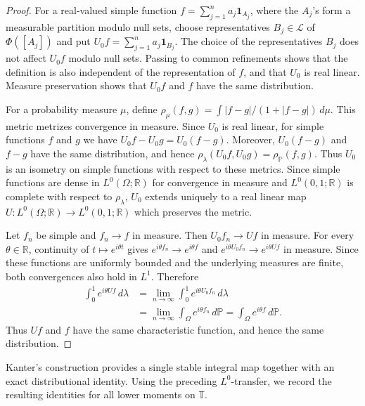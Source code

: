 \documentclass[10pt,a4paper]{amsart}
\newcommand{\T}{\mathbb{T}}
\newcommand{\R}{\mathbb{R}}
\begin{document}
\begin{proof}

For a real-valued simple function
\(f=\sum_{j=1}^n a_j\mathbf1_{A_j}\), where the \(A_j\)'s form a
measurable partition modulo null sets, choose representatives
\(B_j\in\mathcal L\) of \(\Phi([A_j])\) and put
\(U_0f=\sum_{j=1}^n a_j\mathbf1_{B_j}\).
The choice of the representatives \(B_j\) does not affect \(U_0f\)
modulo null sets. Passing to common refinements shows that the
definition is also independent of the representation of \(f\), and
that \(U_0\) is real linear. Measure preservation shows that \(U_0f\)
and \(f\) have the same distribution.

For a probability measure \(\mu\), define
\(\rho_\mu(f,g)=\int |f-g|/(1+|f-g|)\,d\mu\).
This metric metrizes convergence in measure. Since \(U_0\) is real
linear, for simple functions \(f\) and \(g\) we have
\(U_0f-U_0g=U_0(f-g)\). Moreover, \(U_0(f-g)\) and \(f-g\) have the
same distribution, and hence
\(\rho_\lambda(U_0f,U_0g)=\rho_{\mathbb P}(f,g)\).
Thus \(U_0\) is an isometry on simple functions with respect to these
metrics. Since simple functions are dense in \(L^0(\Omega;\R)\) for
convergence in measure and \(L^0(0,1;\R)\) is complete with respect
to \(\rho_\lambda\), \(U_0\) extends uniquely to a real linear map
\(U:L^0(\Omega;\R)\to L^0(0,1;\R)\) which preserves the metric.

Let \(f_n\) be simple and \(f_n\to f\) in measure. Then
\(U_0f_n\to Uf\) in measure. For every \(\theta\in\R\), continuity of
\(t\mapsto e^{i\theta t}\) gives
\(e^{i\theta f_n}\to e^{i\theta f}\) and
\(e^{i\theta U_0f_n}\to e^{i\theta Uf}\) in measure.
Since these functions are uniformly bounded and the underlying
measures are finite, both convergences also hold in \(L^1\).
Therefore
\[
\begin{aligned}
        \int_0^1 e^{i\theta Uf}\,d\lambda
        &=
        \lim_{n\to\infty}
        \int_0^1 e^{i\theta U_0f_n}\,d\lambda \\
        &=
        \lim_{n\to\infty}
        \int_\Omega e^{i\theta f_n}\,d\mathbb P
        =
        \int_\Omega e^{i\theta f}\,d\mathbb P.
\end{aligned}
\]
Thus \(Uf\) and \(f\) have the same characteristic function, and
hence the same distribution.
\end{proof}

Kanter's construction provides a single stable integral map together
with an exact distributional identity. Using the preceding
\(L^0\)-transfer, we record the resulting identities for all lower
moments on \(\T\).
\end{document}
